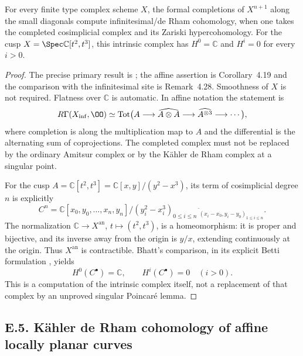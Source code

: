 \begin{theorem}\label{thm:DE-intrinsic-nerve}
For every finite type complex scheme $X$, the formal completions of $X^{n+1}$ along the small diagonals compute infinitesimal/de Rham cohomology, when one takes the completed cosimplicial complex and its Zariski hypercohomology.  For the cusp $X=\Spec\mathbb C[t^2,t^3]$, this intrinsic complex has $H^0=\mathbb C$ and $H^i=0$ for every $i>0$.
\end{theorem}
\begin{proof}
The precise primary result is \cite[Corollary~4.30]{Bhatt2012}; the affine assertion is Corollary~4.19 and the comparison with the infinitesimal site is Remark~4.28.  Smoothness of $X$ is not required.  Flatness over $\mathbb C$ is automatic.  In affine notation the statement is
\[
 R\Gamma(X_{\mathrm{inf}},\OO)\simeq
 \operatorname{Tot}\bigl(A\longrightarrow\widehat{A\otimes A}
     \longrightarrow\widehat{A^{\otimes3}}\longrightarrow\cdots\bigr),
\]
where completion is along the multiplication map to $A$ and the differential is the alternating sum of coprojections.  The completed complex must not be replaced by the ordinary Amitsur complex or by the K\"ahler de Rham complex at a singular point.

For the cusp $A=\mathbb C[t^2,t^3]=\mathbb C[x,y]/(y^2-x^3)$, its term of cosimplicial degree $n$ is explicitly
\[
 C^n=\mathbb C[x_0,y_0,\ldots,x_n,y_n]/(y_i^2-x_i^3)_{0\leq i\leq n}
       \ {}^{\widehat{\ }}_{(x_i-x_0,y_i-y_0)_{1\leq i\leq n}}.
\]
The normalization $\mathbb C\to X^{\mathrm{an}}$, $t\mapsto(t^2,t^3)$, is a homeomorphism: it is proper and bijective, and its inverse away from the origin is $y/x$, extending continuously at the origin.  Thus $X^{\mathrm{an}}$ is contractible.  Bhatt's comparison, in its explicit Betti formulation \cite[Example~4.23]{Bhatt2012}, yields
\[
 H^0(C^\bullet)=\mathbb C,\qquad H^i(C^\bullet)=0\quad(i>0).
\]
This is a computation of the intrinsic complex itself, not a replacement of that complex by an unproved singular Poincar\'e lemma.
\end{proof}

\subsection{E.5. K\"ahler de Rham cohomology of affine locally planar curves}

